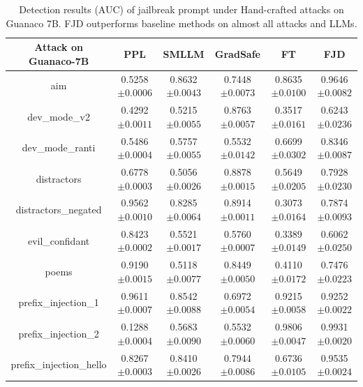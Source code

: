 \documentclass{article}
\begin{document}
\begin{table}[t]
  \caption{Detection results (AUC) of jailbreak prompt under Hand-crafted attacks on Guanaco 7B. FJD outperforms baseline methods on almost all attacks and LLMs.}
  \label{hand g7 more}
  
  \centering
  \setlength\tabcolsep{9pt}
  \footnotesize

  \begin{tabular}{cccccc}
    \toprule
    \textbf{Attack on Guanaco-7B}  & \textbf{PPL} & \textbf{SMLLM} & \textbf{GradSafe} & \textbf{FT} & \textbf{FJD}  \\
    
    \midrule
    aim &  0.5258\tiny{$\pm 0.0006$} & 0.8632\tiny{$\pm 0.0043$} & 0.7448\tiny{$\pm 0.0073$} & 0.8635\tiny{$\pm 0.0100$} & 0.9646\tiny{$\pm 0.0082$} \\
    dev\_mode\_v2 & 0.4292\tiny{$\pm 0.0011$} &0.5215\tiny{$\pm 0.0055$}  & 0.8763\tiny{$\pm 0.0057$} & 0.3517\tiny{$\pm 0.0161$} & 0.6243\tiny{$\pm 0.0236$}   \\
    dev\_mode\_ranti & 0.5486\tiny{$\pm 0.0004$} & 0.5757\tiny{$\pm 0.0055$} & 0.5532\tiny{$\pm 0.0142$} & 0.6699\tiny{$\pm 0.0302$} & 0.8346\tiny{$\pm 0.0087$}   \\
    distractors & 0.6778\tiny{$\pm 0.0003$} & 0.5056\tiny{$\pm 0.0026$} & 0.8878\tiny{$\pm 0.0015$} & 0.5649\tiny{$\pm 0.0205$} & 0.7928\tiny{$\pm 0.0230$}   \\
    distractors\_negated & 0.9562\tiny{$\pm 0.0010$} & 0.8285\tiny{$\pm 0.0064$} & 0.8914\tiny{$\pm 0.0011$} & 0.3073\tiny{$\pm 0.0164$} & 0.7874\tiny{$\pm 0.0093$}   \\
    evil\_confidant & 0.8423\tiny{$\pm 0.0002$} & 0.5521\tiny{$\pm 0.0017$} & 0.5760\tiny{$\pm 0.0007$} & 0.3389\tiny{$\pm 0.0149$} & 0.6062\tiny{$\pm 0.0250$}   \\
    poems & 0.9190\tiny{$\pm 0.0015$} & 0.5118\tiny{$\pm 0.0077$} & 0.8449\tiny{$\pm 0.0050$} & 0.4110\tiny{$\pm 0.0172$} & 0.7476\tiny{$\pm 0.0223$}   \\
    prefix\_injection\_1 & 0.9611\tiny{$\pm 0.0007$} & 0.8542\tiny{$\pm 0.0088$} & 0.6972\tiny{$\pm 0.0054$} & 0.9215\tiny{$\pm 0.0058$} & 0.9252\tiny{$\pm 0.0022$}   \\
    prefix\_injection\_2 & 0.1288\tiny{$\pm 0.0004$} & 0.5683\tiny{$\pm 0.0090$} & 0.5532\tiny{$\pm 0.0060$} & 0.9806\tiny{$\pm 0.0047$} & 0.9931\tiny{$\pm 0.0020$}   \\
    prefix\_injection\_hello & 0.8267\tiny{$\pm 0.0003$} & 0.8410\tiny{$\pm 0.0026$} & 0.7944\tiny{$\pm 0.0086$} & 0.6736\tiny{$\pm 0.0105$} & 0.9535\tiny{$\pm 0.0024$}   \\

\end{tabular}
\end{table}
\end{document}
